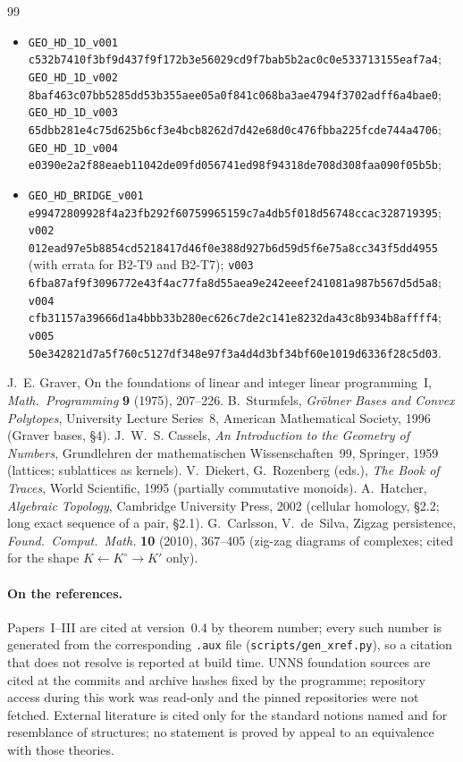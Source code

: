 \begin{thebibliography}{99}
\begin{itemize}[leftmargin=1.4em,itemsep=1pt,topsep=2pt]
\item\texttt{GEO\_HD\_1D\_v001} \texttt{c532b7410f3bf9d437f9f172b3e56029cd9f7bab5b2ac0c0e533713155eaf7a4}; \texttt{GEO\_HD\_1D\_v002} \texttt{8baf463c07bb5285dd53b355aee05a0f841c068ba3ae4794f3702adff6a4bae0}; \texttt{GEO\_HD\_1D\_v003} \texttt{65dbb281e4c75d625b6cf3e4bcb8262d7d42e68d0c476fbba225fcde744a4706}; \texttt{GEO\_HD\_1D\_v004} \texttt{e0390e2a2f88eaeb11042de09fd056741ed98f94318de708d308faa090f05b5b};
\item\texttt{GEO\_HD\_BRIDGE\_v001} \texttt{e99472809928f4a23fb292f60759965159c7a4db5f018d56748ccac328719395}; \texttt{v002} \texttt{012ead97e5b8854cd5218417d46f0e388d927b6d59d5f6e75a8cc343f5dd4955} (with errata for B2-T9 and B2-T7); \texttt{v003} \texttt{6fba87af9f3096772e43f4ac77fa8d55aea9e242eeef241081a987b567d5d5a8}; \texttt{v004} \texttt{cfb31157a39666d1a4bbb33b280ec626c7de2c141e8232da43c8b934b8affff4}; \texttt{v005} \texttt{50e342821d7a5f760c5127df348e97f3a4d4d3bf34bf60e1019d6336f28c5d03}.
\end{itemize}
 J.~E. Graver, On the foundations of linear and integer linear programming~I, \emph{Math.\ Programming} \textbf{9} (1975), 207--226.
 B.~Sturmfels, \emph{Gr\"obner Bases and Convex Polytopes}, University Lecture Series~8, American Mathematical Society, 1996 (Graver bases, \S4).
 J.~W.~S. Cassels, \emph{An Introduction to the Geometry of Numbers}, Grundlehren der mathematischen Wissenschaften~99, Springer, 1959 (lattices; sublattices as kernels).
 V.~Diekert, G.~Rozenberg (eds.), \emph{The Book of Traces}, World Scientific, 1995 (partially commutative monoids).
 A.~Hatcher, \emph{Algebraic Topology}, Cambridge University Press, 2002 (cellular homology, \S2.2; long exact sequence of a pair, \S2.1).
 G.~Carlsson, V.~de~Silva, Zigzag persistence, \emph{Found.\ Comput.\ Math.} \textbf{10} (2010), 367--405 (zig-zag diagrams of complexes; cited for the shape $K\leftarrow K^\circ\to K'$ only).
\end{thebibliography}
\paragraph{On the references.} Papers~I--III are cited at version~0.4 by theorem number; every such number is generated from the corresponding \texttt{.aux} file (\texttt{scripts/gen\_xref.py}), so a citation that does not resolve is reported at build time. UNNS foundation sources are cited at the commits and archive hashes fixed by the programme; repository access during this work was read-only and the pinned repositories were not fetched. External literature is cited only for the standard notions named and for resemblance of structures; no statement is proved by appeal to an equivalence with those theories.
